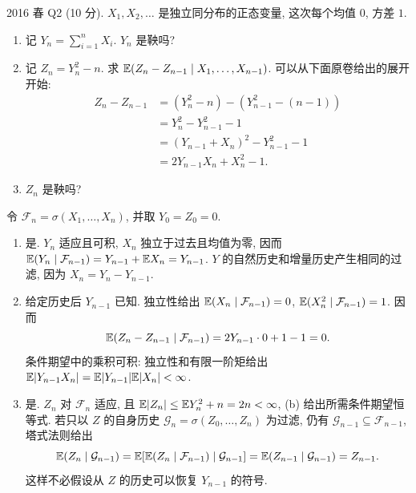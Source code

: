 \begin{exercise}\label{ex:fe2016q2}
2016 春 Q2 (10 分). $X_1,X_2,\ldots$ 是独立同分布的正态变量, 这次每个均值 $0$, 方差 $1$.
\begin{enumerate}[label=(\alph*)]
\item\label{ex:fe2016q2-a} 记 $Y_n=\sum_{i=1}^nX_i$. $Y_n$ 是鞅吗?
\item\label{ex:fe2016q2-b} 记 $Z_n=Y_n^2-n$. 求 $\mathbb E(Z_n-Z_{n-1}\mid X_1,\ldots,X_{n-1})$. 可以从下面原卷给出的展开开始:
\begin{align*}
 Z_n-Z_{n-1}&=(Y_n^2-n)-(Y_{n-1}^2-(n-1))\\
 &=Y_n^2-Y_{n-1}^2-1\\
 &=(Y_{n-1}+X_n)^2-Y_{n-1}^2-1\\
 &=2Y_{n-1}X_n+X_n^2-1.
\end{align*}
\item\label{ex:fe2016q2-c} $Z_n$ 是鞅吗?
\end{enumerate}
\end{exercise}
\begin{solution}
令 $\mathcal F_n=\sigma(X_1,\ldots,X_n)$, 并取 $Y_0=Z_0=0$.
\begin{enumerate}[label=(\alph*)]
\item\label{sol:fe2016q2-a} 是. $Y_n$ 适应且可积, $X_n$ 独立于过去且均值为零, 因而 $\mathbb E(Y_n\mid\mathcal F_{n-1})=Y_{n-1}+\mathbb E X_n=Y_{n-1}$. $Y$ 的自然历史和增量历史产生相同的过滤, 因为 $X_n=Y_n-Y_{n-1}$.
\item\label{sol:fe2016q2-b} 给定历史后 $Y_{n-1}$ 已知. 独立性给出 $\mathbb E(X_n\mid\mathcal F_{n-1})=0$, $\mathbb E(X_n^2\mid\mathcal F_{n-1})=1$. 因而
\[
 \mathbb E(Z_n-Z_{n-1}\mid\mathcal F_{n-1})
 =2Y_{n-1}\cdot0+1-1=0.
\]
条件期望中的乘积可积: 独立性和有限一阶矩给出 $\mathbb E|Y_{n-1}X_n|=\mathbb E|Y_{n-1}|\mathbb E|X_n|<\infty$.
\item\label{sol:fe2016q2-c} 是. $Z_n$ 对 $\mathcal F_n$ 适应, 且 $\mathbb E|Z_n|\le\mathbb E Y_n^2+n=2n<\infty$, (b) 给出所需条件期望恒等式. 若只以 $Z$ 的自身历史 $\mathcal G_n=\sigma(Z_0,\ldots,Z_n)$ 为过滤, 仍有 $\mathcal G_{n-1}\subseteq\mathcal F_{n-1}$, 塔式法则给出
\[
 \mathbb E(Z_n\mid\mathcal G_{n-1})
 =\mathbb E[\mathbb E(Z_n\mid\mathcal F_{n-1})\mid\mathcal G_{n-1}]
 =\mathbb E(Z_{n-1}\mid\mathcal G_{n-1})=Z_{n-1}.
\]
这样不必假设从 $Z$ 的历史可以恢复 $Y_{n-1}$ 的符号.
\end{enumerate}
\end{solution}

